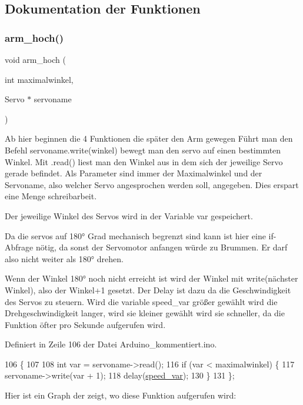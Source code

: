 \subsection{Dokumentation der Funktionen}
\mbox{\label{_arduino__kommentiert_8ino_a74bfcf85e5418694eb99df53d30c8fab}} 
\subsubsection{\texorpdfstring{arm\+\_\+hoch()}{arm\_hoch()}}
{\footnotesize\ttfamily void arm\+\_\+hoch (\begin{DoxyParamCaption}\item[{int}]{maximalwinkel,  }\item[{Servo $\ast$}]{servoname }\end{DoxyParamCaption})}



Ab hier beginnen die 4 Funktionen die später den Arm gewegen Führt man den Befehl servoname.\+write(winkel) bewegt man den servo auf einen bestimmten Winkel. Mit .read() liest man den Winkel aus in dem sich der jeweilige Servo gerade befindet. Als Parameter sind immer der Maximalwinkel und der Servoname, also welcher Servo angesprochen werden soll, angegeben. Dies erspart eine Menge schreibarbeit. 

Der jeweilige Winkel des Servos wird in der Variable var gespeichert.

Da die servos auf 180° Grad mechanisch begrenzt sind kann ist hier eine if-\/\+Abfrage nötig, da sonst der Servomotor anfangen würde zu Brummen. Er darf also nicht weiter als 180° drehen.

Wenn der Winkel 180° noch nicht erreicht ist wird der Winkel mit write(nächster Winkel), also der Winkel+1 gesetzt. Der Delay ist dazu da die Geschwindigkeit des Servos zu steuern. Wird die variable speed\+\_\+var größer gewählt wird die Drehgeschwindigkeit langer, wird sie kleiner gewählt wird sie schneller, da die Funktion öfter pro Sekunde aufgerufen wird.

Definiert in Zeile 106 der Datei Arduino\+\_\+kommentiert.\+ino.


\begin{DoxyCode}
106                                                     \{
107 
108   \textcolor{keywordtype}{int} var = servoname->read(); 
116   \textcolor{keywordflow}{if} (var < maximalwinkel) \{
117     servoname->write(var + 1);
118     delay(\hyperlink{_arduino__kommentiert_8ino_a8b03f5396d8e845086daab48dcaca5cb}{speed\_var});
130   \}
131 \};
\end{DoxyCode}
Hier ist ein Graph der zeigt, wo diese Funktion aufgerufen wird\+:
\mbox{\label{_arduino__kommentiert_8ino_a5b873994166a952d81f787c307ca08d9}} 
